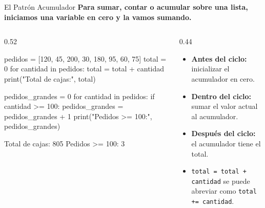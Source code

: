 \documentclass[aspectratio=169, 11pt]{beamer}
\begin{document}
\begin{frame}[fragile,shrink=30]{El Patrón Acumulador}
  \vspace{-6pt}
  {\small\color{arcaDark}\bfseries
    Para sumar, contar o acumular sobre una lista,
    iniciamos una variable en cero y la vamos sumando.}

  \vspace{4pt}
  \begin{columns}[T]
    \begin{column}{0.52\textwidth}
      \begin{pyblock}
pedidos = [120, 45, 200, 30, 180, 95, 60, 75]
total = 0
for cantidad in pedidos:
    total = total + cantidad
print("Total de cajas:", total)

pedidos_grandes = 0
for cantidad in pedidos:
    if cantidad >= 100:
        pedidos_grandes = pedidos_grandes + 1
print("Pedidos >= 100:", pedidos_grandes)
      \end{pyblock}
      \vspace{-2pt}
      \begin{outputblock}
Total de cajas: 805
Pedidos >= 100: 3
      \end{outputblock}
    \end{column}

    \begin{column}{0.44\textwidth}
      {\footnotesize\color{textMuted}
      \begin{itemize}\setlength{\itemsep}{6pt}
        \item[{\color{arcaRed}\scriptsize\faArrowRight}]
          \textbf{Antes del ciclo:}
          inicializar el acumulador en cero.

        \item[{\color{arcaRed}\scriptsize\faArrowRight}]
          \textbf{Dentro del ciclo:}
          sumar el valor actual al
          acumulador.

        \item[{\color{arcaRed}\scriptsize\faArrowRight}]
          \textbf{Después del ciclo:}
          el acumulador tiene el total.

        \item[{\color{arcaRed}\scriptsize\faLightbulb}]
          \texttt{total = total + cantidad}
          se puede abreviar como
          \texttt{total += cantidad}.
      \end{itemize}
      }
    \end{column}
  \end{columns}
\end{frame}
\end{document}
